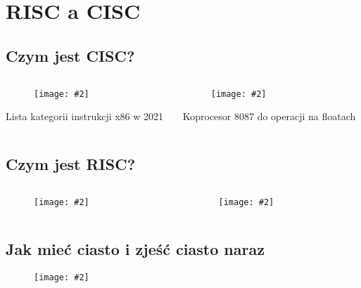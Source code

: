 \documentclass[aspectratio=169]{beamer}
\newcommand{\obrazek}[2]{
\begin{figure}[h]
    \centering
    \texttt{[image: \#2]}
\end{figure}
}
\begin{document}
\section{RISC a CISC}
\subsection{Czym jest CISC?}
\begin{frame}
    \begin{columns}
        \begin{column}{.3\textwidth}
            \obrazek{.09}{/home/hakiergrzonzo/Desktop/polibuda/notatki II/LTK/procesor/x86.png}
            \begin{center}
                \tiny{Lista kategorii instrukcji x86 w 2021}
            \end{center}
        \end{column}
        \begin{column}{.7\textwidth}
            \obrazek{.4}{/home/hakiergrzonzo/Desktop/polibuda/notatki II/LTK/procesor/x87.jpg}
            \begin{center}
                \tiny{Koprocesor 8087 do operacji na floatach}
            \end{center}
        \end{column}
    \end{columns}
\end{frame}

\subsection{Czym jest RISC?}
\begin{frame}
    \begin{columns}
        \begin{column}{.3\textwidth}
            \obrazek{.15}{/home/hakiergrzonzo/Desktop/polibuda/notatki II/LTK/procesor/riscV.jpg}
        \end{column}
        \begin{column}{.7\textwidth}
            \obrazek{.25}{/home/hakiergrzonzo/Desktop/polibuda/notatki II/LTK/procesor/arm.png}
        \end{column}
    \end{columns}
\end{frame}

\subsection{Jak mieć ciasto i zjeść ciasto naraz}
\begin{frame}
    \obrazek{.35}{/home/hakiergrzonzo/Desktop/polibuda/notatki II/LTK/procesor/microcode.png}
\end{frame}
\end{document}

